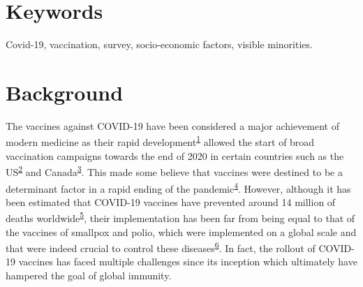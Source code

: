 \documentclass[
  letterpaper,
  DIV=11,
  numbers=noendperiod]{scrartcl}
\begin{document}
\hypertarget{keywords}{%
\section*{Keywords}\label{keywords}}

Covid-19, vaccination, survey, socio-economic factors, visible
minorities.

\hypertarget{background}{%
\section{Background}\label{background}}

The vaccines against COVID-19 have been considered a major achievement
of modern medicine as their rapid
development\textsuperscript{\protect\hyperlink{ref-davis2022}{1}}
allowed the start of broad vaccination campaigns towards the end of 2020
in certain countries such as the
US\textsuperscript{\protect\hyperlink{ref-tanne2020}{2}} and
Canada\textsuperscript{\protect\hyperlink{ref-bogoch2022}{3}}. This made
some believe that vaccines were destined to be a determinant factor in a
rapid ending of the
pandemic\textsuperscript{\protect\hyperlink{ref-thelancet2021}{4}}.
However, although it has been estimated that COVID-19 vaccines have
prevented around 14 million of deaths
worldwide\textsuperscript{\protect\hyperlink{ref-watson2022}{5}}, their
implementation has been far from being equal to that of the vaccines of
smallpox and polio, which were implemented on a global scale and that
were indeed crucial to control these
diseases\textsuperscript{\protect\hyperlink{ref-kayser2021}{6}}. In
fact, the rollout of COVID-19 vaccines has faced multiple challenges
since its inception which ultimately have hampered the goal of global
immunity.
\end{document}
